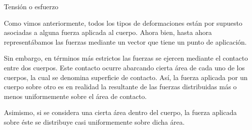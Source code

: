 \documentclass[11pt,handout,aspectratio=1610]{beamer}
\newcommand{\vs}{\vspace{11pt}}
\begin{document}
\begin{frame}{Tensión o esfuerzo}

    Como vimos anteriormente, todos los tipos de deformaciones están por supuesto asociadas a alguna fuerza aplicada al cuerpo. Ahora bien, hasta ahora representábamos las fuerzas mediante un vector que tiene un punto de aplicación.

    \vs

    Sin embargo, en términos más estrictos las fuerzas se ejercen mediante el contacto entre dos cuerpos. Este contacto ocurre abarcando cierta área de cada uno de los cuerpos, la cual se denomina superficie de contacto. Así, la fuerza aplicada por un cuerpo sobre otro es en realidad la resultante de las fuerzas distribuidas más o menos uniformemente sobre el área de contacto.

    \vs 

    Asimismo, si se considera una cierta área dentro del cuerpo, la fuerza aplicada sobre éste se distribuye casi uniformemente sobre dicha área.

\end{frame}
\end{document}
